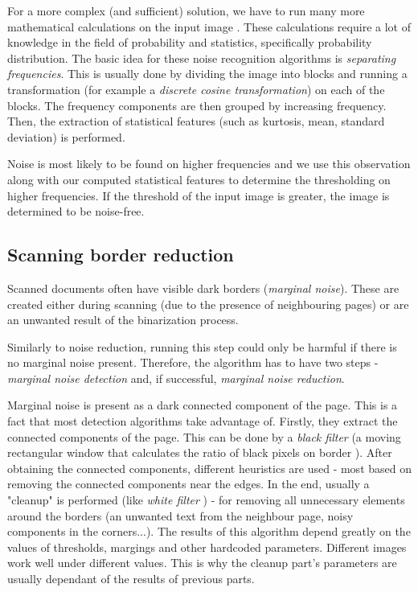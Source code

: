 For a more complex (and sufficient) solution, we have to run many more mathematical calculations on the input image \citep{noiseDetection}. These calculations require a lot of knowledge in the field of probability and statistics, specifically probability distribution. The basic idea for these noise recognition algorithms is \emph{separating frequencies}. This is usually done by dividing the image into blocks and running a transformation (for example a \emph{discrete cosine transformation}) on each of the blocks. The frequency components are then grouped by increasing frequency. Then, the extraction of statistical features (such as kurtosis, mean, standard deviation) is performed.

Noise is most likely to be found on higher frequencies and we use this observation along with our computed statistical features to determine the thresholding on higher frequencies. If the threshold of the input image is greater, the image is determined to be noise-free. 

\subsection{Scanning border reduction}

Scanned documents often have visible dark borders (\emph{marginal noise}). These are created either during scanning (due to the presence of neighbouring pages) or are an unwanted result of the binarization process.

Similarly to noise reduction, running this step could only be harmful if there is no marginal noise present. Therefore, the algorithm has to have two steps - \emph{marginal noise detection} and, if successful, \emph{marginal noise reduction}.

Marginal noise is present as a dark connected component of the page. This is a fact that most detection algorithms take advantage of. Firstly, they extract the connected components of the page. This can be done by a \emph{black filter} (a moving rectangular window that calculates the ratio of black pixels on border \citep{marginalNoiseWindow}). After obtaining the connected components, different heuristics are used - most based on removing the connected components near the edges. In the end, usually a "cleanup" is performed (like \emph{white filter} \citep{marginalNoiseWindow}) - for removing all unnecessary elements around the borders (an unwanted text from the neighbour page, noisy components in the corners...).
The results of this algorithm depend greatly on the values of thresholds, margings and other hardcoded parameters. Different images work well under different values. This is why the cleanup part's parameters are usually dependant of the results of previous parts.


